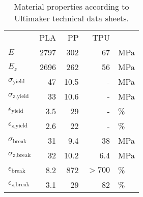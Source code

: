 
\begin{table}
	\centering
	\caption{Material properties according to Ultimaker technical data sheets.}
	\label{tab:mat_props}
	\begin{tabular}{lrrrl}
		& PLA & PP & TPU & \\
		$E$ & 2797 & 302 & 67 & \si{\mega\pascal} \\
		$E_z$ & 2696 & 262 & 56 & \si{\mega\pascal} \\
		$\sigma_\text{yield}$ & 47 & 10.5 & - & \si{\mega\pascal} \\
		$\sigma_\text{z,yield}$ & 33 & 10.6 & - & \si{\mega\pascal} \\
		$\epsilon_\text{yield}$ & 3.5 & 29 & - & \si{\percent} \\
		$\epsilon_\text{z,yield}$ & 2.6 & 22 & - & \si{\percent} \\
		$\sigma_\text{break}$ & 31 & 9.4 & 38 & \si{\mega\pascal} \\
		$\sigma_\text{z,break}$ & 32 & 10.2 & 6.4 & \si{\mega\pascal} \\
		$\epsilon_\text{break}$ & 8.2 & 872 & $>700$ & \si{\percent} \\
		$\epsilon_\text{z,break}$ & 3.1 & 29 & 82 & \si{\percent} \\
	\end{tabular}
\end{table}

